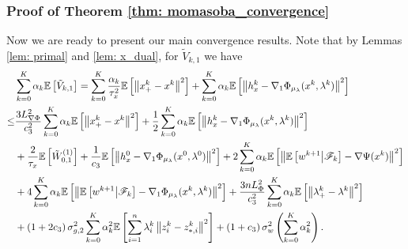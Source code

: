 \documentclass[10pt]{article}
\theoremstyle{remark}
\def\setF{\mathscr{F}} %
\newcommand{\E}{\mathbb{E}}
\newcommand{\norm}[1]{\left\|#1\right\|}
\begin{document}
\subsubsection{Proof of Theorem \ref{thm: momasoba_convergence}}
Now we are ready to present our main convergence results. Note that by Lemmas \eqref{lem: primal} and \eqref{lem: x_dual}, for $\tilde V_{k,1}$ we have
\begin{align}
        &\sum_{k=0}^{K}\alpha_k\E\left[\tilde V_{k,1}\right] = \sum_{k=0}^{K}\frac{\alpha_k}{\tau_x^2}\E\left[\norm{x_+^k-x^k}^2\right] + \sum_{k=0}^{K}\alpha_k\E\left[\norm{h_x^k - \nabla_1\Phi_{\mu_{\lambda}}(x^k, \lambda^k)}^2\right]\notag\\
        \leq & \frac{3L_{\nabla \Phi}^2}{c_3^2}\sum_{k=0}^{K}\alpha_k\E\left[\norm{x_+^k - x^k}^2\right] + \frac{1}{2}\sum_{k=0}^{K}\alpha_k\E\left[\norm{h_x^k - \nabla_1\Phi_{\mu_{\lambda}}(x^k,\lambda^k)}^2\right]\notag\\
        & + \frac{2}{\tau_x}\E\left[\tilde W_{0,1}^{(1)}\right] + \frac{1}{c_3}\E\left[\norm{h_x^0 - \nabla_1\Phi_{\mu_{\lambda}}(x^0, \lambda^0)}^2\right] + 2\sum_{k=0}^{K}\alpha_k\E\left[\norm{\E\left[w^{k+1}\middle|\setF_k\right] - \nabla\Psi(x^k)}^2\right]\notag \\
        & + 4\sum_{k=0}^{K}\alpha_k\E\left[\norm{\E\left[w^{k+1}\middle|\setF_k\right] -\nabla_1\Phi_{\mu_{\lambda}}(x^k,\lambda^k)}^2\right]  + \frac{3nL_{\Phi}^2}{c_3^2}\sum_{k=0}^{K}\alpha_k\E\left[\norm{\lambda_+^k - \lambda^k}^2\right]\notag \\
        & + \left(1+2c_3\right)\sigma_{g,2}^2\sum_{k=0}^{K}\alpha_k^2\E\left[\sum_{i=1}^{n}\lambda_i^k\norm{z_i^k - z_{*,i}^k}^2\right] + \left(1+c_3\right)\sigma_w^2\left(\sum_{k=0}^{K}\alpha_k^2\right).\label{ineq: tildeV_x}
\end{align}
\end{document}
